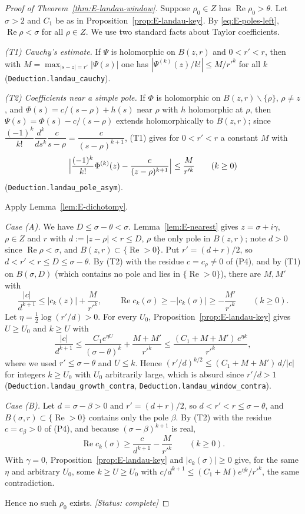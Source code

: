 \begin{proof}[Proof of Theorem~\ref{thm:E-landau-window}]
Suppose $\rho_0\in Z$ has $\operatorname{Re}\rho_0>\theta$. Let $\sigma>2$ and $C_1$ be as in
Proposition~\ref{prop:E-landau-key}. By \eqref{eq:E-poles-left}, $\operatorname{Re}\rho<\sigma$
for all $\rho\in Z$. We use two standard facts about Taylor coefficients.

\emph{(T1) Cauchy's estimate.} If $\Psi$ is holomorphic on $B(z,r)$ and $0<r'<r$, then with
$M=\max_{|s-z|=r'}|\Psi(s)|$ one has $|\Psi^{(k)}(z)/k!|\le M/r'^{k}$ for all $k$
(\texttt{Deduction.landau\_cauchy}).

\emph{(T2) Coefficients near a simple pole.} If $\Phi$ is holomorphic on
$B(z,r)\smallsetminus\{\rho\}$, $\rho\neq z$, and $\Phi(s)=c/(s-\rho)+h(s)$ near $\rho$ with $h$
holomorphic at $\rho$, then $\Psi(s)=\Phi(s)-c/(s-\rho)$ extends holomorphically to $B(z,r)$;
since $\dfrac{(-1)^{k}}{k!}\dfrac{d^{k}}{ds^{k}}\dfrac{c}{s-\rho}=\dfrac{c}{(s-\rho)^{k+1}}$, (T1)
gives for $0<r'<r$ a constant $M$ with
\[
\Bigl|\frac{(-1)^{k}}{k!}\Phi^{(k)}(z)-\frac{c}{(z-\rho)^{k+1}}\Bigr|\le\frac{M}{r'^{k}}\qquad(k\ge0)
\]
(\texttt{Deduction.landau\_pole\_asym}).

Apply Lemma~\ref{lem:E-dichotomy}.

\emph{Case (A).} We have $D\le\sigma-\theta<\sigma$. Lemma~\ref{lem:E-nearest} gives
$z=\sigma+i\gamma$, $\rho\in Z$ and $r$ with $d:=|z-\rho|<r\le D$, $\rho$ the only pole in
$B(z,r)$; note $d>0$ since $\operatorname{Re}\rho<\sigma$, and $B(z,r)\subset\{\operatorname{Re}>0\}$.
Put $r'=(d+r)/2$, so $d<r'<r\le D\le\sigma-\theta$. By (T2) with the residue $c=c_\rho\neq0$ of
(P4), and by (T1) on $B(\sigma,D)$ (which contains no pole and lies in
$\{\operatorname{Re}>0\}$), there are $M,M'$ with
\[
\frac{|c|}{d^{k+1}}\le|c_k(z)|+\frac{M}{r'^{k}},\qquad
\operatorname{Re}c_k(\sigma)\ge-|c_k(\sigma)|\ge-\frac{M'}{r'^{k}}\qquad(k\ge0).
\]
Let $\eta=\tfrac12\log(r'/d)>0$. For every $U_0$, Proposition~\ref{prop:E-landau-key} gives
$U\ge U_0$ and $k\ge U$ with
\[
\frac{|c|}{d^{k+1}}\le\frac{C_1e^{\eta U}}{(\sigma-\theta)^{k}}+\frac{M+M'}{r'^{k}}\le
\frac{(C_1+M+M')\,e^{\eta k}}{r'^{k}},
\]
where we used $r'\le\sigma-\theta$ and $U\le k$. Hence
$(r'/d)^{k/2}\le(C_1+M+M')\,d/|c|$ for integers $k\ge U_0$ with $U_0$ arbitrarily large, which is
absurd since $r'/d>1$ (\texttt{Deduction.landau\_growth\_contra},
\texttt{Deduction.landau\_window\_contra}).

\emph{Case (B).} Let $d=\sigma-\beta>0$ and $r'=(d+r)/2$, so $d<r'<r\le\sigma-\theta$, and
$B(\sigma,r)\subset\{\operatorname{Re}>0\}$ contains only the pole $\beta$. By (T2) with the residue
$c=c_\beta>0$ of (P4), and because $(\sigma-\beta)^{k+1}$ is real,
\[
\operatorname{Re}c_k(\sigma)\ge\frac{c}{d^{k+1}}-\frac{M}{r'^{k}}\qquad(k\ge0).
\]
With $\gamma=0$, Proposition~\ref{prop:E-landau-key} and $|c_k(\sigma)|\ge0$ give, for the same
$\eta$ and arbitrary $U_0$, some $k\ge U\ge U_0$ with
$c/d^{k+1}\le(C_1+M)e^{\eta k}/r'^{k}$, the same contradiction.

Hence no such $\rho_0$ exists.
\textit{[Status: complete]}
\end{proof}

